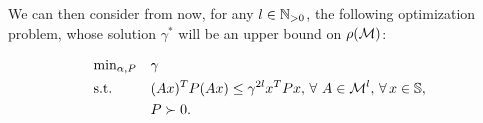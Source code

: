 We can then consider from now, for any $l \in \mathbb{N}_{>0}$, the following optimization problem, whose solution $\gamma^{*}$ will be an upper bound on $\rho(\mathcal{M})$:

\begin{equation}\label{eqn:campiOpt2}
\begin{aligned}
& \text{min}_{\alpha, P} & & \gamma \\
& \text{s.t.} 
&  & (Ax)^TP(Ax) \leq \gamma^{2l} x^TPx,\,\forall\ A \in \mathcal{M}^l, \,\forall\, x \in \mathbb{S},\\
& && P \succ 0. \\
\end{aligned}
\end{equation}